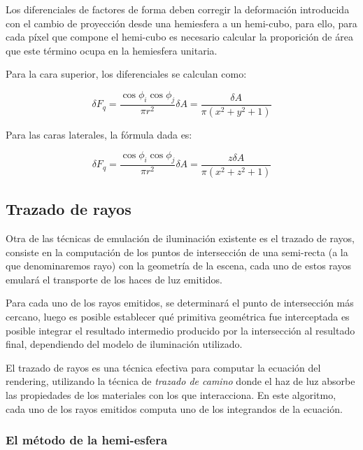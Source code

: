 Los diferenciales de factores de forma deben corregir la deformación introducida con el cambio de proyección desde una hemiesfera a un hemi-cubo, para ello, para cada píxel que compone el hemi-cubo es necesario calcular la proporición de área que este término ocupa en la hemiesfera unitaria.

Para la cara superior, los diferenciales se calculan como:

\begin{equation}
	\delta{F_{q}} = \frac{\cos{\phi_{i}}\cos{\phi_{j}}}{\pi{r^{2}}} \delta{A} = \frac{\delta{A}}{\pi({x^{2} + y^{2} + 1})} 
\end{equation}

Para las caras laterales, la fórmula dada es:

\begin{equation}
\delta{F_{q}} = \frac{\cos{\phi_{i}}\cos{\phi_{j}}}{\pi{r^{2}}}\delta{A} = \frac{z\delta{A}}{\pi({x^{2} + z^{2} + 1})}
\end{equation}


\subsection{Trazado de rayos}
\label{sec:raytracing}

Otra de las técnicas de emulación de iluminación existente es el trazado de rayos, consiste en la computación de los puntos de intersección de una semi-recta (a la que denominaremos rayo) con la geometría de la escena, cada uno de estos rayos emulará el transporte de los haces de luz emitidos.

Para cada uno de los rayos emitidos, se determinará el punto de intersección más cercano, luego es posible establecer qué primitiva geométrica fue interceptada es posible integrar el resultado intermedio producido por la intersección al resultado final, dependiendo del modelo de iluminación utilizado.

El trazado de rayos es una técnica efectiva \cite{Kajiya} para computar la ecuación del rendering, utilizando la técnica de \textit{trazado de camino} donde el haz de luz absorbe las propiedades de los materiales con los que interacciona. En este algoritmo, cada uno de los rayos emitidos computa uno de los integrandos de la ecuación.

\subsubsection{El método de la hemi-esfera}

